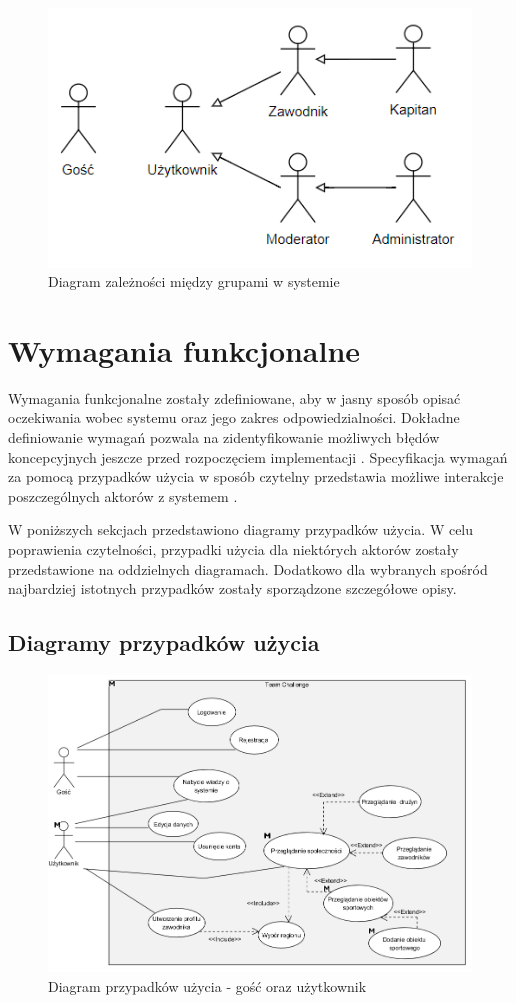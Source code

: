 \begin{figure}[H]
\centering
\includegraphics[width=0.5\linewidth]{04-projekt/rys/roles.PNG}
\caption{Diagram zależności między grupami w systemie}
\label{fig:diagram-trad-alg-opt}
\end{figure}


\section{Wymagania funkcjonalne}

Wymagania funkcjonalne zostały zdefiniowane, aby w jasny sposób opisać oczekiwania wobec systemu oraz jego zakres odpowiedzialności. Dokładne definiowanie wymagań pozwala na zidentyfikowanie możliwych błędów koncepcyjnych jeszcze przed rozpoczęciem implementacji \cite{requirements}. Specyfikacja wymagań za pomocą przypadków użycia w sposób czytelny przedstawia możliwe interakcje poszczególnych aktorów z systemem \cite{usecase}.

W poniższych sekcjach przedstawiono diagramy przypadków użycia. W celu poprawienia czytelności, przypadki użycia dla niektórych aktorów zostały przedstawione na oddzielnych diagramach. Dodatkowo dla wybranych spośród najbardziej istotnych przypadków zostały sporządzone szczegółowe opisy.


\subsection{Diagramy przypadków użycia}

\begin{figure}[H]
\centering
\includegraphics[width=\linewidth]{04-projekt/rys/usecase1.PNG}
\caption{Diagram przypadków użycia - gość oraz użytkownik}
\label{fig:diagram-trad-alg-opt}
\end{figure}

